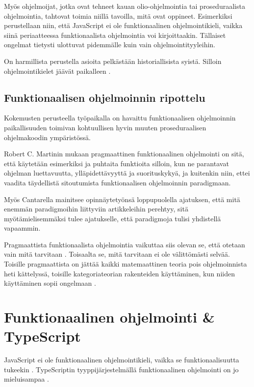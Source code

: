 Myös ohjelmoijat, jotka ovat tehneet kauan olio-ohjelmointia tai proseduraalista ohjelmointia, tahtovat toimia niillä tavoilla, mitä ovat oppineet. Esimerkiksi perustellaan niin, että JavaScript ei ole funktionaalinen ohjelmointikieli, vaikka siinä periaatteessa funktionaalista ohjelmointia voi kirjoittaakin. Tällaiset ongelmat tietysti ulottuvat pidemmälle kuin vain ohjelmointityyleihin. \citep{is_reduce_bad}

On harmillista perustella asioita pelkästään historiallisista syistä. Silloin ohjelmointikielet jäävät paikalleen \cite{promises-spec-94}.

\subsection{Funktionaalisen ohjelmoinnin ripottelu}

Kokemusten perusteella työpaikalla on havaittu funktionaalisen ohjelmoinnin paikallisuuden toimivan kohtuullisen hyvin muuten proseduraalisen ohjelmakoodin ympäristössä.

Robert C. Martinin mukaan pragmaattinen funktionaalinen ohjelmointi on sitä, että käytetään esimerkiksi  ja puhtaita funktioita silloin, kun ne parantavat ohjelman luettavuutta, ylläpidettävyyttä ja suorituskykyä, ja kuitenkin niin, ettei vaadita täydellistä sitoutumista funktionaalisen ohjelmoinnin paradigmaan. \citep{martin2017pragmaticfp}

Myös Cantarella mainitsee opinnäytetyönsä loppupuolella ajatuksen, että mitä enemmän paradigmoihin liittyviin artikkeleihin perehtyy, sitä myötämielisemmäksi tulee ajatukselle, että paradigmoja tulisi yhdistellä vapaammin. \citep[45]{cantarella_fp_haitat}

Pragmaattista funktionaalista ohjelmointia vaikuttaa siis olevan se, että otetaan vain mitä tarvitaan \cite{dear_functional_bros,martin2017pragmaticfp,cantarella_fp_haitat}. Toisaalta se, mitä tarvitaan ei ole välittömästi selvää. Toisille pragmaattista on jättää kaikki matemaattinen teoria pois ohjelmoinnista heti kättelyssä, toisille kategoriateorian rakenteiden käyttäminen, kun niiden käyttäminen sopii ongelmaan \cite{holvikari2021category,martin2017pragmaticfp}.

\section{Funktionaalinen ohjelmointi \& TypeScript}
JavaScript ei ole funktionaalinen ohjelmointikieli, vaikka se funktionaalisuutta tukeekin \cite{is_reduce_bad}. TypeScriptin tyyppijärjestelmällä funktionaalinen ohjelmointi on jo mieluisampaa \cite{holvikari2021category}.


